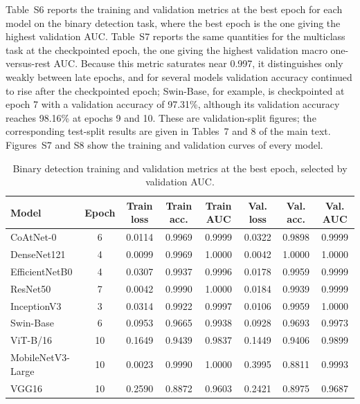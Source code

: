 \documentclass[11pt]{article}
\newcommand{\tablenumber}[1]{\setcounter{table}{\numexpr#1-1\relax}}
\begin{document}
Table~S6 reports the training and validation metrics at the best epoch for each model on the binary detection task, where the best epoch is the one giving the highest validation AUC. Table~S7 reports the same quantities for the multiclass task at the checkpointed epoch, the one giving the highest validation macro one-versus-rest AUC. Because this metric saturates near 0.997, it distinguishes only weakly between late epochs, and for several models validation accuracy continued to rise after the checkpointed epoch; Swin-Base, for example, is checkpointed at epoch 7 with a validation accuracy of 97.31\%, although its validation accuracy reaches 98.16\% at epochs 9 and 10. These are validation-split figures; the corresponding test-split results are given in Tables~7 and 8 of the main text. Figures~S7 and S8 show the training and validation curves of every model.

\begin{table}[htbp]
\tablenumber{6}
\centering
\caption{Binary detection training and validation metrics at the best epoch, selected by validation AUC.}
\label{tab:s6}
\small
\begin{tabular*}{\textwidth}{@{\extracolsep{\fill}}lccccccc@{}}
\toprule
Model & Epoch & Train loss & Train acc. & Train AUC & Val. loss & Val. acc. & Val. AUC \\
\midrule
CoAtNet-0 & 6 & 0.0114 & 0.9969 & 0.9999 & 0.0322 & 0.9898 & 0.9999 \\
DenseNet121 & 4 & 0.0099 & 0.9969 & 1.0000 & 0.0042 & 1.0000 & 1.0000 \\
EfficientNetB0 & 4 & 0.0307 & 0.9937 & 0.9996 & 0.0178 & 0.9959 & 0.9999 \\
ResNet50 & 7 & 0.0042 & 0.9990 & 1.0000 & 0.0184 & 0.9939 & 0.9999 \\
InceptionV3 & 3 & 0.0314 & 0.9922 & 0.9997 & 0.0106 & 0.9959 & 1.0000 \\
Swin-Base & 6 & 0.0953 & 0.9665 & 0.9938 & 0.0928 & 0.9693 & 0.9973 \\
ViT-B/16 & 10 & 0.1649 & 0.9439 & 0.9837 & 0.1449 & 0.9406 & 0.9899 \\
MobileNetV3-Large & 10 & 0.0023 & 0.9990 & 1.0000 & 0.3995 & 0.8811 & 0.9993 \\
VGG16 & 10 & 0.2590 & 0.8872 & 0.9603 & 0.2421 & 0.8975 & 0.9687 \\
\bottomrule
\end{tabular*}
\end{table}
\end{document}
